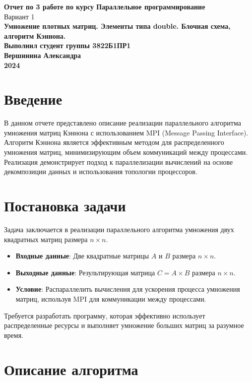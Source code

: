 \documentclass[12pt]{article}
\begin{document}
\begin{titlepage}
    \centering
    \vspace*{5cm}
    {\Huge \textbf{Отчет по 3 работе по курсу Параллельное программирование}}\\[1cm]
    {\large Вариант 1}\\[2cm]
    \textbf{Умножение плотных матриц. Элементы типа double. Блочная схема, алгоритм Кэннона.}\\[4cm]
    \textbf{Выполнил студент группы 3822Б1ПР1}\\[0.5cm]
    \textbf{Вершинина Александра}\\[1cm]
    \textbf{2024}
\end{titlepage}

\section{Введение}

В данном отчете представлено описание реализации параллельного алгоритма умножения матриц Кэннона с использованием MPI (Message Passing Interface). Алгоритм Кэннона является эффективным методом для распределенного умножения матриц, минимизирующим объем коммуникаций между процессами. Реализация демонстрирует подход к параллелизации вычислений на основе декомпозиции данных и использования топологии процессоров.

\section{Постановка задачи}

\noindent
Задача заключается в реализации параллельного алгоритма умножения двух квадратных матриц размера $n \times n$. 
\begin{itemize}
    \item \textbf{Входные данные}: Две квадратные матрицы $A$ и $B$ размера $n \times n$.
    \item \textbf{Выходные данные}: Результирующая матрица $C = A \times B$ размера $n \times n$.
    \item \textbf{Условие}: Распараллелить вычисления для ускорения процесса умножения матриц, используя MPI для коммуникации между процессами.
\end{itemize}
Требуется разработать программу, которая эффективно использует распределенные ресурсы и выполняет умножение больших матриц за разумное время.

\section{Описание алгоритма}
\end{document}

